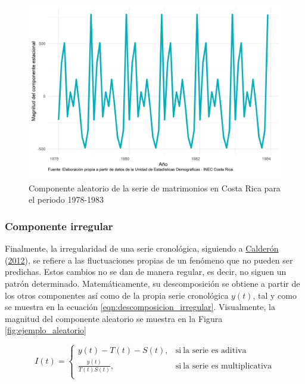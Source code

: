 \documentclass[
]{article}
\begin{document}
\begin{figure}[H]
\includegraphics[width=1\linewidth,height=1\textheight]{Tesis_files/figure-latex/ejemplo_estacional-1} \caption{Componente aleatorio de la serie de matrimonios en Costa Rica para el periodo 1978-1983 \textcolor{white}{prueba de aaaaaaaaaaaaaaaaaaaaaaa}}\label{fig:ejemplo_estacional}
\end{figure}

\subsubsection{Componente irregular}

Finalmente, la irregularidad de una serie cronológica, siguiendo a
\protect\hyperlink{ref-calderon2012estadistica}{Calderón}
(\protect\hyperlink{ref-calderon2012estadistica}{2012}), se refiere a
las fluctuaciones propias de un fenómeno que no pueden ser predichas.
Estos cambios no se dan de manera regular, es decir, no siguen un patrón
determinado. Matemáticamente, su descomposición se obtiene a partir de
los otros componentes así como de la propia serie cronológica \(y(t)\),
tal y como se muestra en la ecuación
\eqref{eqn:descomposicion_irregular}. Visualmente, la magnitud del
componente aleatorio se muestra en la Figura \ref{fig:ejemplo_aleatorio}

\begin{equation}
\label{eqn:descomposicion_irregular}
I(t)=
\begin{cases}
y(t)-T(t)-S(t), & \text{si}\ \text{la serie es aditiva} \\
\frac{y(t)}{T(t)S(t)} , & \text{si}\ \text{la serie es multiplicativa} \\
\end{cases}
\end{equation}
\end{document}
